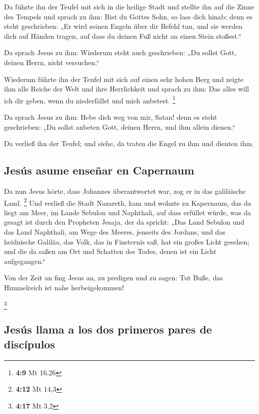  Da führte ihn der Teufel mit sich in die heilige Stadt
und stellte ihn auf die Zinne des Tempels  und sprach zu
ihm: Bist du Gottes Sohn, so lass dich hinab; denn es steht geschrieben:
„Er wird seinen Engeln über dir Befehl tun, und sie werden dich auf
Händen tragen, auf dass du deinen Fuß nicht an einen Stein stoßest.``

 Da sprach Jesus zu ihm: Wiederum steht auch geschrieben:
„Du sollst Gott, deinen Herrn, nicht versuchen.``

 Wiederum führte ihn der Teufel mit sich auf einen sehr
hohen Berg und zeigte ihm alle Reiche der Welt und ihre Herrlichkeit
 und sprach zu ihm: Das alles will ich dir geben, wenn du
niederfällst und mich anbetest. \footnote{\textbf{4:9} Mt 16,26}

 Da sprach Jesus zu ihm: Hebe dich weg von mir, Satan!
denn es steht geschrieben: „Du sollst anbeten Gott, deinen Herrn, und
ihm allein dienen.``

 Da verließ ihn der Teufel; und siehe, da traten die
Engel zu ihm und dienten ihm.

\hypertarget{jesuxfas-asume-enseuxf1ar-en-capernaum}{%
\subsection{Jesús asume enseñar en
Capernaum}\label{jesuxfas-asume-enseuxf1ar-en-capernaum}}

 Da nun Jesus hörte, dass Johannes überantwortet war, zog
er in das galiläische Land. \footnote{\textbf{4:12} Mt 14,3}
 Und verließ die Stadt Nazareth, kam und wohnte zu
Kapernaum, das da liegt am Meer, im Lande Sebulon und Naphthali,
 auf dass erfüllet würde, was da gesagt ist durch den
Propheten Jesaja, der da spricht:  „Das Land Sebulon und
das Land Naphthali, am Wege des Meeres, jenseits des Jordans, und das
heidnische Galiläa,  das Volk, das in Finsternis saß, hat
ein großes Licht gesehen; und die da saßen am Ort und Schatten des
Todes, denen ist ein Licht aufgegangen.``

 Von der Zeit an fing Jesus an, zu predigen und zu sagen:
Tut Buße, das Himmelreich ist nahe herbeigekommen!

\footnote{\textbf{4:17} Mt 3,2}

\hypertarget{jesuxfas-llama-a-los-dos-primeros-pares-de-discuxedpulos}{%
\subsection{Jesús llama a los dos primeros pares de
discípulos}\label{jesuxfas-llama-a-los-dos-primeros-pares-de-discuxedpulos}}

